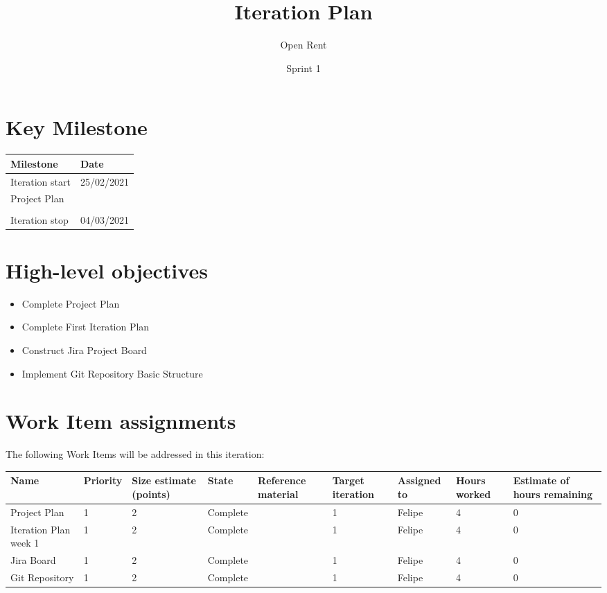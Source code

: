 \documentclass[a4paper,notitlepage]{article}%
\begin{document}
\title{Iteration Plan}
\author{Open Rent}
\date{Sprint 1}
\maketitle

\section{Key Milestone}

\noindent\begin{tabular}{|l|l|}
\hline
Milestone       & Date \\ \hline
Iteration start & 25/02/2021  \\ \hline
Project Plan    &      \\ \hline
                &      \\ \hline
Iteration stop  &  04/03/2021 \\ \hline
\end{tabular}

\section{High-level objectives}

\begin{itemize}
	\item Complete Project Plan
	\item	Complete First Iteration Plan
	\item	Construct Jira Project Board
	\item Implement Git Repository Basic Structure
\end{itemize}

\section{Work Item assignments}

The following Work Items will be addressed in this iteration:

\begin{adjustbox}{width=\textwidth}
\noindent\begin{tabular}{|l|l|l|l|l|l|l|l|l|}
\hline
Name & Priority & Size estimate (points) & State & Reference material & Target iteration & Assigned to & Hours worked & Estimate of hours remaining \\ \hline
Project Plan    & 1 &  2 &  Complete  & & 1 & Felipe & 4 & 0 \\ \hline
Iteration Plan week 1 & 1 &  2 &  Complete  & & 1 & Felipe & 4 & 0 \\ \hline
Jira Board & 1 &  2 &  Complete  & & 1 & Felipe & 4 & 0 \\ \hline
Git Repository & 1 &  2 &  Complete  & & 1 & Felipe & 4 & 0 \\ \hline
\end{tabular}
\end{adjustbox}
\end{document}
